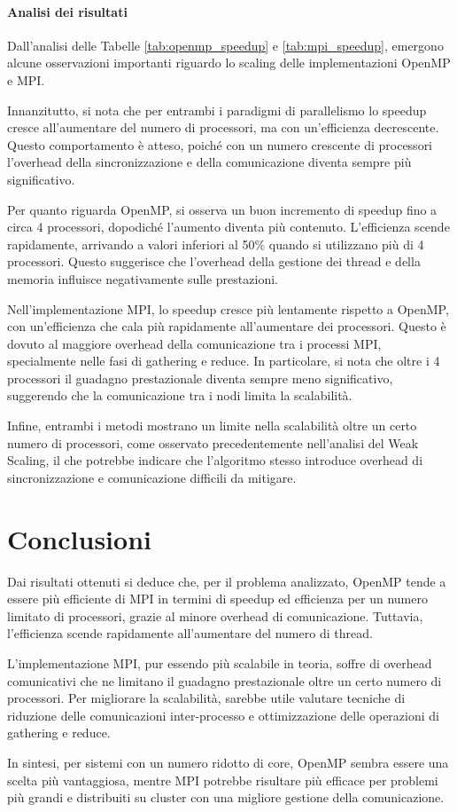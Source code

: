 \documentclass[letterpaper,11pt,leqno]{article}
\begin{document}
\paragraph{Analisi dei risultati} Dall'analisi delle Tabelle \ref{tab:openmp_speedup} e \ref{tab:mpi_speedup}, emergono alcune osservazioni importanti riguardo lo scaling delle implementazioni OpenMP e MPI.

Innanzitutto, si nota che per entrambi i paradigmi di parallelismo lo speedup cresce all'aumentare del numero di processori, ma con un'efficienza decrescente. Questo comportamento è atteso, poiché con un numero crescente di processori l'overhead della sincronizzazione e della comunicazione diventa sempre più significativo.

Per quanto riguarda OpenMP, si osserva un buon incremento di speedup fino a circa 4 processori, dopodiché l'aumento diventa più contenuto. L'efficienza scende rapidamente, arrivando a valori inferiori al 50\% quando si utilizzano più di 4 processori. Questo suggerisce che l'overhead della gestione dei thread e della memoria influisce negativamente sulle prestazioni.

Nell'implementazione MPI, lo speedup cresce più lentamente rispetto a OpenMP, con un'efficienza che cala più rapidamente all'aumentare dei processori. Questo è dovuto al maggiore overhead della comunicazione tra i processi MPI, specialmente nelle fasi di gathering e reduce. In particolare, si nota che oltre i 4 processori il guadagno prestazionale diventa sempre meno significativo, suggerendo che la comunicazione tra i nodi limita la scalabilità.

Infine, entrambi i metodi mostrano un limite nella scalabilità oltre un certo numero di processori, come osservato precedentemente nell'analisi del Weak Scaling,
 il che potrebbe indicare che l'algoritmo stesso introduce overhead di sincronizzazione e comunicazione difficili da mitigare.

\section{Conclusioni}

Dai risultati ottenuti si deduce che, per il problema analizzato, OpenMP tende a essere più efficiente di MPI in termini di speedup ed efficienza per un numero limitato di processori, grazie al minore overhead di comunicazione. Tuttavia, l'efficienza scende rapidamente all'aumentare del numero di thread.

L'implementazione MPI, pur essendo più scalabile in teoria, soffre di overhead comunicativi che ne limitano il guadagno prestazionale oltre un certo numero di processori. Per migliorare la scalabilità, sarebbe utile valutare tecniche di riduzione delle comunicazioni inter-processo e ottimizzazione delle operazioni di gathering e reduce.

In sintesi, per sistemi con un numero ridotto di core, OpenMP sembra essere una scelta più vantaggiosa, mentre MPI potrebbe risultare più efficace per problemi più grandi e distribuiti su cluster con una migliore gestione della comunicazione.
\end{document}
